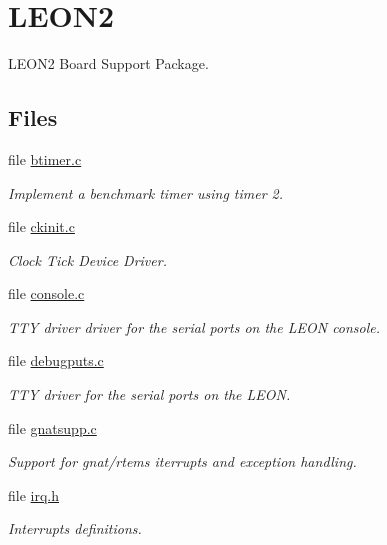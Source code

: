 \hypertarget{group__RTEMSBSPsSPARCLEON2}{}\section{L\+E\+O\+N2}
\label{group__RTEMSBSPsSPARCLEON2}


L\+E\+O\+N2 Board Support Package.  


\subsection*{Files}
\begin{DoxyCompactItemize}
\item 
file \mbox{\hyperlink{sparc_2leon2_2btimer_2btimer_8c}{btimer.\+c}}
\begin{DoxyCompactList}\small\item\em Implement a benchmark timer using timer 2. \end{DoxyCompactList}\item 
file \mbox{\hyperlink{sparc_2leon2_2clock_2ckinit_8c}{ckinit.\+c}}
\begin{DoxyCompactList}\small\item\em Clock Tick Device Driver. \end{DoxyCompactList}\item 
file \mbox{\hyperlink{sparc_2leon2_2console_2console_8c}{console.\+c}}
\begin{DoxyCompactList}\small\item\em T\+TY driver driver for the serial ports on the L\+E\+ON console. \end{DoxyCompactList}\item 
file \mbox{\hyperlink{leon2_2console_2debugputs_8c}{debugputs.\+c}}
\begin{DoxyCompactList}\small\item\em T\+TY driver for the serial ports on the L\+E\+ON. \end{DoxyCompactList}\item 
file \mbox{\hyperlink{leon2_2gnatsupp_2gnatsupp_8c}{gnatsupp.\+c}}
\begin{DoxyCompactList}\small\item\em Support for gnat/rtems iterrupts and exception handling. \end{DoxyCompactList}\item 
file \mbox{\hyperlink{bsps_2sparc_2leon2_2include_2bsp_2irq_8h}{irq.\+h}}
\begin{DoxyCompactList}\small\item\em Interrupts definitions. \end{DoxyCompactList}\item 

\end{DoxyCompactItemize}
